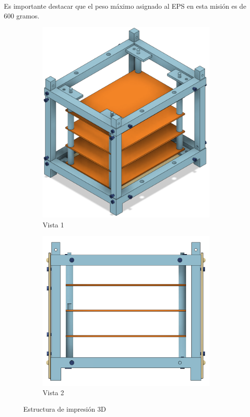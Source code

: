 Es importante destacar que el peso máximo asignado al EPS en esta misión es de 600 gramos.



\begin{figure}[b]
  \centering
  \begin{subfigure}[b]{0.35\textwidth}
    \includegraphics[width=\textwidth]{Pictures/3DPrinting.png}
    \caption{Vista 1}
    \label{fig:imagen1}
  \end{subfigure}
  \hfill
  \begin{subfigure}[b]{0.40\textwidth}
    \includegraphics[width=\textwidth]{Pictures/Lateral3DPrinting.png}
    \caption{Vista 2}
    \label{fig:imagen2}
  \end{subfigure}

  \caption{Estructura de impresión 3D}
  \label{fig:dos_imagenes}
\end{figure}
